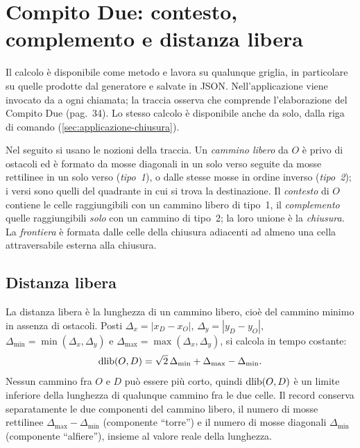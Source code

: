 \section{Compito Due: contesto, complemento e distanza libera}
\label{sec:compito2}

Il calcolo è disponibile come metodo  e lavora su qualunque griglia, in particolare su quelle prodotte dal
generatore e salvate in JSON. Nell'applicazione viene invocato da \cmin{}
a ogni chiamata; la traccia osserva che \cmin{} comprende l'elaborazione
del Compito Due (pag.~34). Lo stesso calcolo è disponibile anche da solo,
dalla riga di comando (\cref{sec:applicazione-chiusura}).

Nel seguito si usano le nozioni della traccia. Un \emph{cammino libero} da
$O$ è privo di ostacoli ed è formato da mosse diagonali in un solo verso
seguite da mosse rettilinee in un solo verso (\emph{tipo~1}), o dalle stesse
mosse in ordine inverso (\emph{tipo~2}); i versi sono quelli del quadrante in
cui si trova la destinazione. Il \emph{contesto} di $O$ contiene le celle
raggiungibili con un cammino libero di tipo~1, il \emph{complemento} quelle
raggiungibili \emph{solo} con un cammino di tipo~2; la loro unione è la
\emph{chiusura}. La \emph{frontiera} è formata dalle celle della chiusura
adiacenti ad almeno una cella attraversabile esterna alla chiusura.

\subsection{Distanza libera}

La distanza libera è la lunghezza di un cammino libero, cioè del cammino
minimo in assenza di ostacoli. Posti $\Delta_x = |x_D - x_O|$,
$\Delta_y = |y_D - y_O|$, $\Delta_{\min} = \min(\Delta_x,\Delta_y)$ e
$\Delta_{\max} = \max(\Delta_x,\Delta_y)$, si calcola in tempo costante:
\begin{equation}
  \operatorname{dlib}(O,D) = \sqrt{2}\,\Delta_{\min} + \Delta_{\max} - \Delta_{\min}.
  \label{eq:dlib}
\end{equation}
Nessun cammino fra $O$ e $D$ può essere più corto, quindi $\operatorname{dlib}(O,D)$ è un
limite inferiore della lunghezza di qualunque cammino fra le due celle. Il
record  conserva separatamente le due componenti del
cammino libero, il numero di mosse rettilinee $\Delta_{\max} - \Delta_{\min}$
(componente ``torre'') e il numero di mosse diagonali $\Delta_{\min}$ (componente
``alfiere''), insieme al valore reale della lunghezza.

